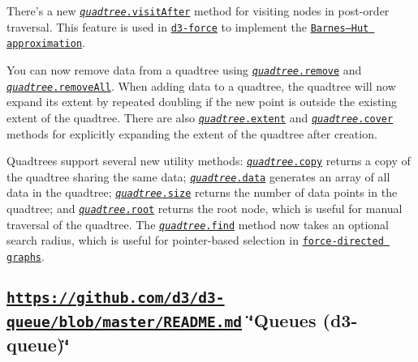 There’s a new \href{https://github.com/d3/d3-quadtree/blob/master/README.md#quadtree_visitAfter}{\tt {\itshape quadtree}.visit\+After} method for visiting nodes in post-\/order traversal. This feature is used in \href{#forces-d3-force}{\tt d3-\/force} to implement the \href{https://en.wikipedia.org/wiki/Barnes–Hut_simulation}{\tt Barnes–\+Hut approximation}.

You can now remove data from a quadtree using \href{https://github.com/d3/d3-quadtree/blob/master/README.md#quadtree_remove}{\tt {\itshape quadtree}.remove} and \href{https://github.com/d3/d3-quadtree/blob/master/README.md#quadtree_removeAll}{\tt {\itshape quadtree}.remove\+All}. When adding data to a quadtree, the quadtree will now expand its extent by repeated doubling if the new point is outside the existing extent of the quadtree. There are also \href{https://github.com/d3/d3-quadtree/blob/master/README.md#quadtree_extent}{\tt {\itshape quadtree}.extent} and \href{https://github.com/d3/d3-quadtree/blob/master/README.md#quadtree_cover}{\tt {\itshape quadtree}.cover} methods for explicitly expanding the extent of the quadtree after creation.

Quadtrees support several new utility methods\+: \href{https://github.com/d3/d3-quadtree/blob/master/README.md#quadtree_copy}{\tt {\itshape quadtree}.copy} returns a copy of the quadtree sharing the same data; \href{https://github.com/d3/d3-quadtree/blob/master/README.md#quadtree_data}{\tt {\itshape quadtree}.data} generates an array of all data in the quadtree; \href{https://github.com/d3/d3-quadtree/blob/master/README.md#quadtree_size}{\tt {\itshape quadtree}.size} returns the number of data points in the quadtree; and \href{https://github.com/d3/d3-quadtree/blob/master/README.md#quadtree_root}{\tt {\itshape quadtree}.root} returns the root node, which is useful for manual traversal of the quadtree. The \href{https://github.com/d3/d3-quadtree/blob/master/README.md#quadtree_find}{\tt {\itshape quadtree}.find} method now takes an optional search radius, which is useful for pointer-\/based selection in \href{https://bl.ocks.org/mbostock/ad70335eeef6d167bc36fd3c04378048}{\tt force-\/directed graphs}.

\subsection*{\href{https://github.com/d3/d3-queue/blob/master/README.md}{\tt https\+://github.\+com/d3/d3-\/queue/blob/master/\+R\+E\+A\+D\+M\+E.\+md} \char`\"{}\+Queues (d3-\/queue)\char`\"{}}

